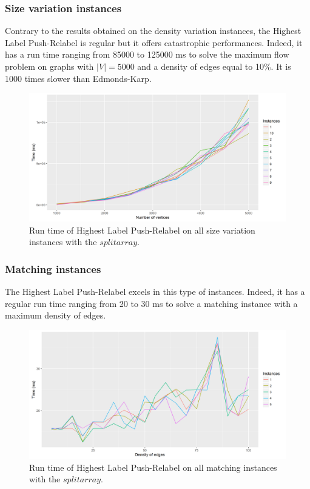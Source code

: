 \subsubsection{Size variation instances}
Contrary to the results obtained on the density variation instances, the Highest Label Push-Relabel is regular but it offers catastrophic performances. Indeed, it has a run time ranging from 85000 to 125000 ms to solve the maximum flow problem on graphs with $|V|=5000$ and a density of edges equal to 10\%. It is 1000 times slower than Edmonds-Karp.
\begin{figure}[H]
\begin{center}
\includegraphics[scale=0.5]{images/results/HLPRmean.png}
\caption{Run time of Highest Label Push-Relabel on all size variation instances with the $split array$.}
\label{fig:HLPRmean}
\end{center}
\end{figure}
\subsubsection{Matching instances}
The Highest Label Push-Relabel excels in this type of instances. Indeed, it has a regular run time ranging from 20 to 30 ms to solve a matching instance with a maximum density of edges.
\begin{figure}[H]
\begin{center}
\includegraphics[scale=0.5]{images/results/prmatching.png}
\caption{Run time of Highest Label Push-Relabel on all matching instances with the $split array$.}
\label{fig:prmatching}
\end{center}
\end{figure}
